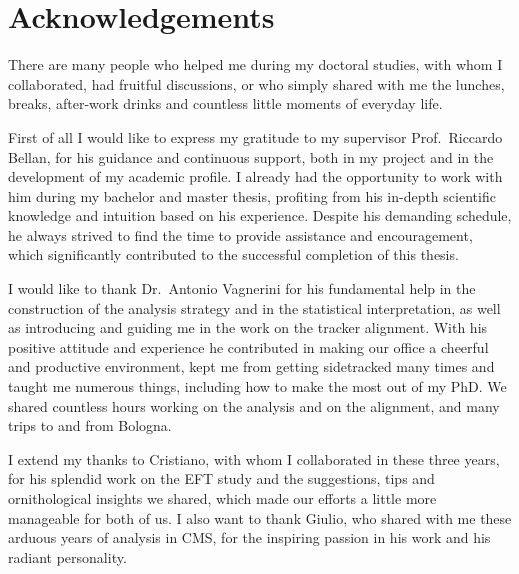 
\chapter{Acknowledgements}
There are many people who helped me during my doctoral studies, with whom I collaborated, had fruitful discussions,
or who simply shared with me the lunches, breaks, after-work drinks and countless little moments of everyday life.

First of all I would like to express my gratitude to my supervisor Prof.~Riccardo Bellan, for his guidance and continuous support,
both in my project and in the development of my academic profile.
I already had the opportunity to work with him during my bachelor and master thesis,
profiting from his in-depth scientific knowledge and intuition based on his experience.
Despite his demanding schedule, he always strived to find the time to provide assistance and encouragement,
which significantly contributed to the successful completion of this thesis.

I would like to thank Dr.~Antonio Vagnerini
for his fundamental help in the construction of the analysis strategy and in the statistical interpretation,
as well as introducing and guiding me in the work on the tracker alignment.
With his positive attitude and experience he contributed in making our office a cheerful and productive environment,
kept me from getting sidetracked many times and taught me numerous things, including how to make the most out of my PhD.
We shared countless hours working on the analysis and on the alignment, and many trips to and from Bologna.

I extend my thanks to Cristiano, with whom I collaborated in these three years,
for his splendid work on the EFT study and the suggestions, tips and ornithological insights we shared,
which made our efforts a little more manageable for both of us.
I also want to thank Giulio, who shared with me these arduous years of analysis in CMS,
for the inspiring passion in his work and his radiant personality.

